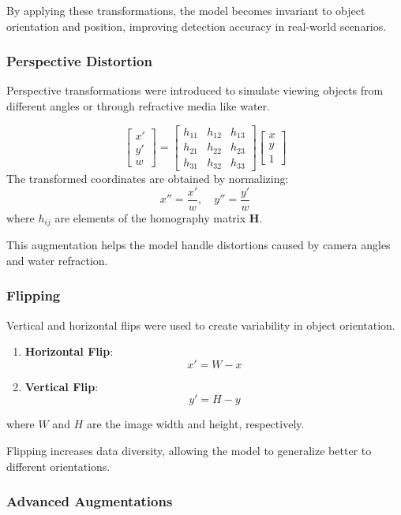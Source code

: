 \documentclass[conference]{IEEEtran}
\begin{document}
By applying these transformations, the model becomes invariant to object orientation and position, improving detection accuracy in real-world scenarios.

\subsubsection{Perspective Distortion}

Perspective transformations were introduced to simulate viewing objects from different angles or through refractive media like water.

\[
\begin{bmatrix}
x' \\ y' \\ w
\end{bmatrix}
=
\begin{bmatrix}
h_{11} & h_{12} & h_{13} \\
h_{21} & h_{22} & h_{23} \\
h_{31} & h_{32} & h_{33}
\end{bmatrix}
\begin{bmatrix}
x \\ y \\ 1
\end{bmatrix}
\]
The transformed coordinates are obtained by normalizing:
\[
x'' = \frac{x'}{w}, \quad y'' = \frac{y'}{w}
\]
where \( h_{ij} \) are elements of the homography matrix \( \mathbf{H} \).

This augmentation helps the model handle distortions caused by camera angles and water refraction.

\subsubsection{Flipping}

Vertical and horizontal flips were used to create variability in object orientation.

\begin{enumerate}
    \item \textbf{Horizontal Flip}:
    \[
    x' = W - x
    \]
    \item \textbf{Vertical Flip}:
    \[
    y' = H - y
    \]
\end{enumerate}
where \( W \) and \( H \) are the image width and height, respectively.

Flipping increases data diversity, allowing the model to generalize better to different orientations.

\subsubsection{Advanced Augmentations}
\end{document}
